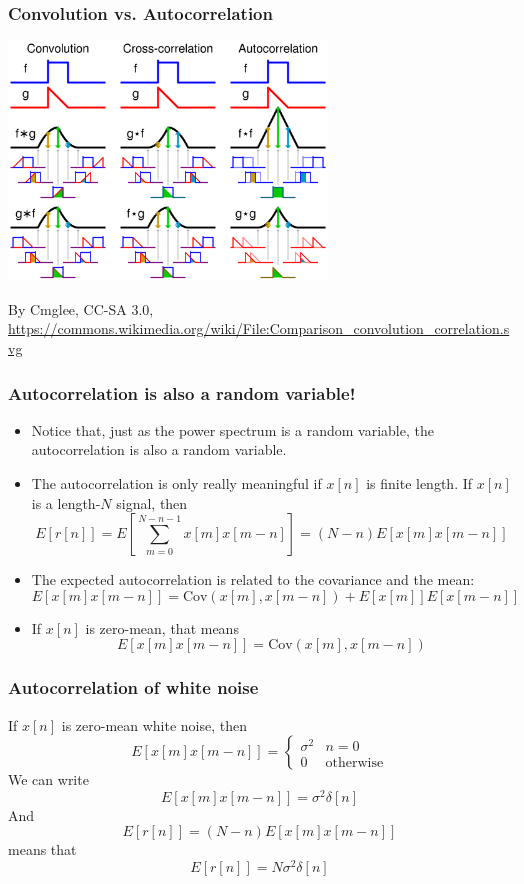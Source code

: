 \documentclass{beamer}
\begin{document}
\begin{frame}
  \frametitle{Convolution vs. Autocorrelation}
  \centerline{\includegraphics[height=2.5in]{Comparison_convolution_correlation.png}}
  \begin{tiny}
    By Cmglee, CC-SA 3.0,
    \url{https://commons.wikimedia.org/wiki/File:Comparison_convolution_correlation.svg}
  \end{tiny}
\end{frame}

\begin{frame}
  \frametitle{Autocorrelation is also a random variable!}

  \begin{itemize}
    \item Notice that, just as the power spectrum is a random
      variable, the autocorrelation is also a random variable.
    \item The autocorrelation is only really meaningful if
      $x[n]$ is finite length.  If $x[n]$ is a length-$N$ signal, then
      \[
      E\left[r[n]\right] =
      E\left[\sum_{m=0}^{N-n-1} x[m]x[m-n]\right]
      = (N-n)E\left[x[m]x[m-n]\right]
      \]
    \item
      The expected autocorrelation is related to the covariance
      and the mean:
      \[
      E\left[x[m]x[m-n]\right]=\mbox{Cov}\left(x[m],x[m-n]\right)+E\left[x[m]\right]E\left[x[m-n]\right]
      \]
    \item
      If $x[n]$ is zero-mean, that means
      \[
      E\left[x[m]x[m-n]\right]=\mbox{Cov}\left(x[m],x[m-n]\right)
      \]
  \end{itemize}
\end{frame}
\begin{frame}
  \frametitle{Autocorrelation of white noise}
  If $x[n]$ is zero-mean white noise, then
  \[
  E\left[x[m]x[m-n]\right]= \begin{cases} \sigma^2 & n=0\\0 &\mbox{otherwise}\end{cases}
  \]
  We can write
  \[
  E\left[x[m]x[m-n]\right]=\sigma^2\delta[n]
  \]
  And
  \[
  E\left[r[n]\right] = (N-n)E\left[x[m]x[m-n]\right]
  \]
  means that
  \[
  E\left[r[n]\right] = N\sigma^2\delta[n]
  \]
\end{frame}
\end{document}
